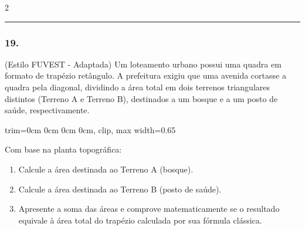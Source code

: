 \documentclass[twoside, 10pt, a4paper]{article}
\newlength{\espacoPreQuestao}\setlength{\espacoPreQuestao}{0.1cm}
\newlength{\espacoQuestao}\setlength{\espacoQuestao}{0.2cm}
\newlength{\espacoAlt}\setlength{\espacoAlt}{0.2cm}
\begin{document}
\begin{multicols*}{2}
\noindent\textcolor{CorLinha}{\rule{\linewidth}{0.5pt}} 
\par\vspace{\espacoPreQuestao}
\subsubsection*{19.} (Estilo FUVEST - Adaptada) Um loteamento urbano possui uma quadra em formato de trapézio retângulo. A prefeitura exigiu que uma avenida cortasse a quadra pela diagonal, dividindo a área total em dois terrenos triangulares distintos (Terreno A e Terreno B), destinados a um bosque e a um posto de saúde, respectivamente.

\begin{center}
\begin{adjustbox}{trim=0cm 0cm 0cm 0cm, clip, max width=0.65\linewidth}
\end{adjustbox}
\end{center}

Com base na planta topográfica:
\begin{enumerate}[label=\alph*), itemsep=\espacoAlt]
\item Calcule a área destinada ao Terreno A (bosque).
\item Calcule a área destinada ao Terreno B (posto de saúde).
\item Apresente a soma das áreas e comprove matematicamente se o resultado equivale à área total do trapézio calculada por sua fórmula clássica.
\end{enumerate}
\par\vspace{\espacoQuestao}


\end{multicols*}
\end{document}
